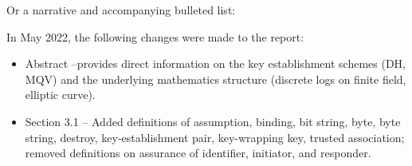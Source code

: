 \begin{appendices}
Or a narrative and accompanying bulleted list:

\vspace{12pt}
In May 2022, the following changes were made to the report:
\begin{itemize}
\item Abstract –provides direct information on the key establishment schemes (DH, MQV) and the underlying mathematics structure (discrete logs on finite field, elliptic curve).
\item Section 3.1 – Added definitions of assumption, binding, bit string, byte, byte string, destroy, key-establishment pair, key-wrapping key, trusted association; removed definitions on assurance of identifier, initiator, and responder.
\end{itemize}

\end{appendices}


